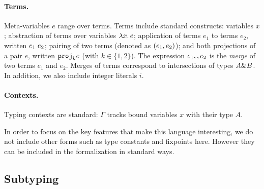\paragraph{Terms.} Meta-variables $e$ range over terms.  Terms include standard
constructs: variables $x$; abstraction of terms over variables
$\lamty x A e$; application of terms $e_1$ to terms $e_2$, written $\app
{e_1} {e_2}$; pairing of two terms (denoted as $\pair {e_1} {e_2}$);
and both projections of a pair $e$, written $\proj k e$ (with $k \in \{1,2\}$).
The expression $e_1 \mergeop e_2$ is the \emph{merge} of two terms
$e_1$ and $e_2$. Merges of terms correspond to intersections of types $A \inter
B$. 
In addition, we also include integer literals $i$.

\paragraph{Contexts.} Typing contexts are standard: $ \Gamma $ tracks bound variables $x$ with their type $A$.


In order to focus on the key features that make this language interesting, we do
not include other forms such as type constants and fixpoints here. However they
can be included in the formalization in standard ways. 


\subsection{Subtyping}


